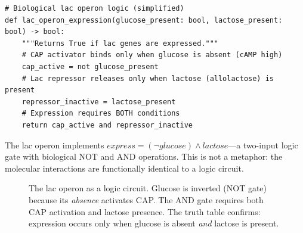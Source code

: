 \begin{lstlisting}[style=dogmapython, caption={The lac operon expressed as pseudocode.}]
# Biological lac operon logic (simplified)
def lac_operon_expression(glucose_present: bool, lactose_present: bool) -> bool:
    """Returns True if lac genes are expressed."""
    # CAP activator binds only when glucose is absent (cAMP high)
    cap_active = not glucose_present
    # Lac repressor releases only when lactose (allolactose) is present
    repressor_inactive = lactose_present
    # Expression requires BOTH conditions
    return cap_active and repressor_inactive
\end{lstlisting}

The lac operon implements $\textit{express} = (\lnot \textit{glucose}) \land \textit{lactose}$---a two-input logic gate with biological NOT and AND operations. This is not a metaphor: the molecular interactions are functionally identical to a logic circuit.

\begin{figure}[H]
\centering
{}
\caption{The lac operon as a logic circuit. Glucose is inverted (NOT gate) because its \emph{absence} activates CAP. The AND gate requires both CAP activation and lactose presence. The truth table confirms: expression occurs only when glucose is absent \emph{and} lactose is present.}
\label{fig:lac-operon-logic}
\end{figure}

